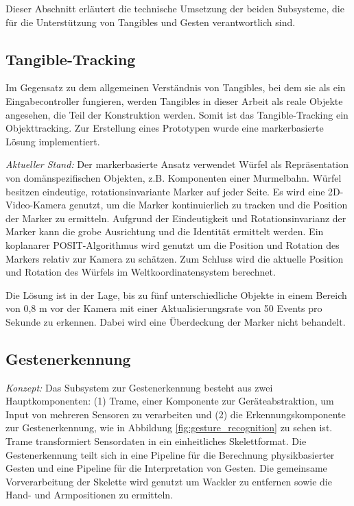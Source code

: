 Dieser Abschnitt erläutert die technische Umsetzung der beiden Subsysteme, die für die Unterstützung von Tangibles und
Gesten verantwortlich sind. 

\subsection{Tangible-Tracking}

Im Gegensatz zu dem allgemeinen Verständnis von Tangibles, bei dem sie als ein Eingabecontroller fungieren, werden
Tangibles in dieser Arbeit als reale Objekte angesehen, die Teil der Konstruktion werden. Somit ist das
Tangible-Tracking ein Objekttracking. Zur Erstellung eines Prototypen wurde eine markerbasierte Lösung implementiert.

{\em Aktueller Stand: } Der markerbasierte Ansatz verwendet Würfel als Repräsentation von domänspezifischen Objekten,
z.B. Komponenten einer Murmelbahn. Würfel besitzen eindeutige, rotationsinvariante Marker auf jeder Seite. Es wird eine
2D-Video-Kamera genutzt, um die Marker kontinuierlich zu tracken und die Position der Marker zu ermitteln. Aufgrund der
Eindeutigkeit und Rotationsinvarianz der Marker kann die grobe Ausrichtung und die Identität ermittelt werden. Ein
koplanarer POSIT-Algorithmus\cite{oberkampf1996iterative} wird genutzt um die Position und Rotation des Markers relativ
zur Kamera zu schätzen. Zum Schluss wird die aktuelle Position und Rotation des Würfels im Weltkoordinatensystem
berechnet.


Die Lösung ist in der Lage, bis zu fünf unterschiedliche Objekte in einem Bereich von 0,8 m vor der Kamera mit einer
Aktualisierungsrate von 50 Events pro Sekunde zu erkennen. Dabei wird eine Überdeckung der Marker nicht behandelt.

\subsection{Gestenerkennung}

{\em Konzept:} Das Subsystem zur Gestenerkennung besteht aus zwei Hauptkomponenten: (1) Trame, einer Komponente zur
Geräteabstraktion, um Input von mehreren Sensoren zu verarbeiten und (2) die Erkennungskomponente zur Gestenerkennung,
wie in Abbildung \ref{fig:gesture_recognition} zu sehen ist. Trame transformiert Sensordaten in ein einheitliches
Skelettformat. Die Gestenerkennung teilt sich in eine Pipeline für die Berechnung physikbasierter Gesten und eine
Pipeline für die Interpretation von Gesten. Die gemeinsame Vorverarbeitung der Skelette wird genutzt um Wackler zu
entfernen sowie die Hand- und Armpositionen zu ermitteln.


